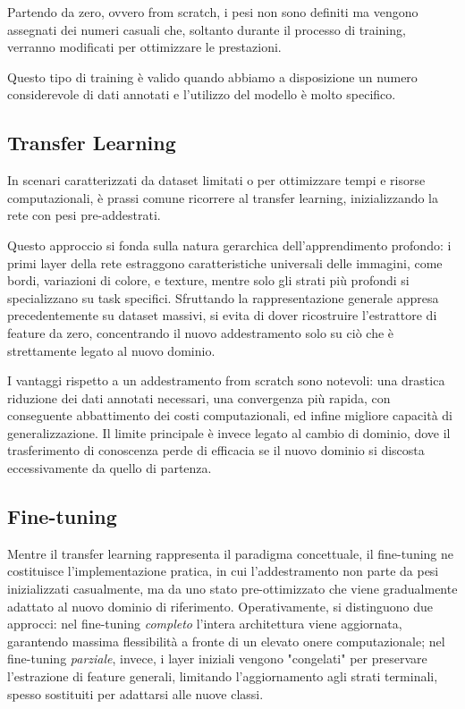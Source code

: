 Partendo da zero, ovvero from scratch, i pesi non sono definiti ma vengono assegnati dei numeri casuali che, soltanto durante il processo di training, verranno modificati per ottimizzare le prestazioni.

Questo tipo di training è valido quando abbiamo a disposizione un numero considerevole di dati annotati e l'utilizzo del modello è molto specifico.

\subsection{Transfer Learning}

In scenari caratterizzati da dataset limitati o per ottimizzare tempi e risorse computazionali, è prassi comune ricorrere al transfer learning, inizializzando la rete con pesi pre-addestrati.

Questo approccio si fonda sulla natura gerarchica dell'apprendimento profondo: i primi layer della rete estraggono caratteristiche universali delle immagini, come bordi, variazioni di colore, e texture,
mentre solo gli strati più profondi si specializzano su task specifici.
Sfruttando la rappresentazione generale appresa precedentemente su dataset massivi, si evita di dover ricostruire l'estrattore di feature da zero, concentrando il nuovo addestramento solo su ciò che è strettamente legato al nuovo dominio.

I vantaggi rispetto a un addestramento from scratch sono notevoli: una drastica riduzione dei dati annotati necessari, una convergenza più rapida, con conseguente abbattimento dei costi computazionali,
ed infine migliore capacità di generalizzazione.
Il limite principale è invece legato al cambio di dominio, dove il trasferimento di conoscenza perde di efficacia se il nuovo dominio si discosta eccessivamente da quello di partenza.

\subsection{Fine-tuning}
\label{sec:fine_tuning}

Mentre il transfer learning rappresenta il paradigma concettuale, il fine-tuning ne costituisce l'implementazione pratica, in cui l'addestramento non parte da pesi inizializzati casualmente,
ma da uno stato pre-ottimizzato che viene gradualmente adattato al nuovo dominio di riferimento.
Operativamente, si distinguono due approcci: nel fine-tuning \textit{completo} l'intera architettura viene aggiornata, garantendo massima flessibilità a fronte di un elevato onere computazionale;
nel fine-tuning \textit{parziale}, invece, i layer iniziali vengono "congelati" per preservare l'estrazione di feature generali, limitando l'aggiornamento agli strati terminali, spesso sostituiti per adattarsi alle nuove classi.

